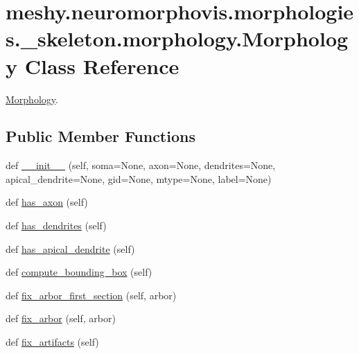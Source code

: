 \hypertarget{classmeshy_1_1neuromorphovis_1_1morphologies_1_1__skeleton_1_1morphology_1_1Morphology}{}\section{meshy.\+neuromorphovis.\+morphologies.\+\_\+skeleton.\+morphology.\+Morphology Class Reference}
\label{classmeshy_1_1neuromorphovis_1_1morphologies_1_1__skeleton_1_1morphology_1_1Morphology}


\hyperlink{classmeshy_1_1neuromorphovis_1_1morphologies_1_1__skeleton_1_1morphology_1_1Morphology}{Morphology}.  


\subsection*{Public Member Functions}
\begin{DoxyCompactItemize}
\item 
def \hyperlink{classmeshy_1_1neuromorphovis_1_1morphologies_1_1__skeleton_1_1morphology_1_1Morphology_a87cfba04ed19605de8d812bbf486d1dc}{\+\_\+\+\_\+init\+\_\+\+\_\+} (self, soma=None, axon=None, dendrites=None, apical\+\_\+dendrite=None, gid=None, mtype=None, label=None)
\item 
def \hyperlink{classmeshy_1_1neuromorphovis_1_1morphologies_1_1__skeleton_1_1morphology_1_1Morphology_ae7675c106adca4b4bda8352ec6e29c80}{has\+\_\+axon} (self)
\item 
def \hyperlink{classmeshy_1_1neuromorphovis_1_1morphologies_1_1__skeleton_1_1morphology_1_1Morphology_a94327d2c6bbb8971d6ff92ad1d76f44d}{has\+\_\+dendrites} (self)
\item 
def \hyperlink{classmeshy_1_1neuromorphovis_1_1morphologies_1_1__skeleton_1_1morphology_1_1Morphology_af2caf3b7392f1f59d2448388afec6597}{has\+\_\+apical\+\_\+dendrite} (self)
\item 
def \hyperlink{classmeshy_1_1neuromorphovis_1_1morphologies_1_1__skeleton_1_1morphology_1_1Morphology_a7b4a02d2151dc123aab5c971c92a0a57}{compute\+\_\+bounding\+\_\+box} (self)
\item 
def \hyperlink{classmeshy_1_1neuromorphovis_1_1morphologies_1_1__skeleton_1_1morphology_1_1Morphology_a57b88ea313a0113553cc3ffd290d80ca}{fix\+\_\+arbor\+\_\+first\+\_\+section} (self, arbor)
\item 
def \hyperlink{classmeshy_1_1neuromorphovis_1_1morphologies_1_1__skeleton_1_1morphology_1_1Morphology_aac0a467accbe141914ed0af7c73cfe7f}{fix\+\_\+arbor} (self, arbor)
\item 
def \hyperlink{classmeshy_1_1neuromorphovis_1_1morphologies_1_1__skeleton_1_1morphology_1_1Morphology_a177a0ae84099661d893ed7a08644ea47}{fix\+\_\+artifacts} (self)
\end{DoxyCompactItemize}
